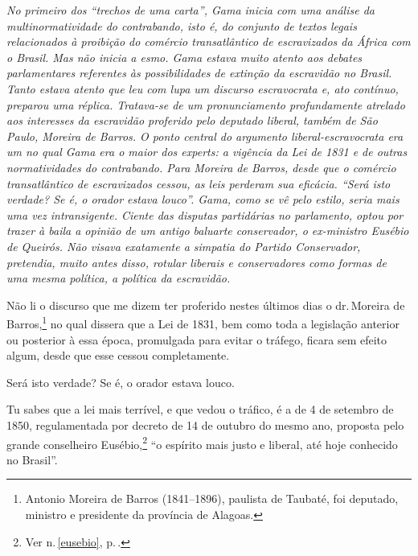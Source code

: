 {

\begin{resumo}
\emph{No primeiro dos ``trechos de uma carta'', Gama inicia com uma
análise da multinormatividade do contrabando, isto é, do conjunto de
textos legais relacionados à proibição do comércio transatlântico de
escravizados da África com o Brasil. Mas não inicia a esmo. Gama estava
muito atento aos debates parlamentares referentes às possibilidades de
extinção da escravidão no Brasil. Tanto estava atento que leu com lupa
um discurso escravocrata e, ato contínuo, preparou uma réplica.
Tratava-se de um pronunciamento profundamente atrelado aos interesses da
escravidão proferido pelo deputado liberal, também de São Paulo, Moreira
de Barros. O ponto central do argumento liberal-escravocrata era um no
qual Gama era o maior dos experts: a vigência da Lei de 1831 e de outras
normatividades do contrabando. Para Moreira de Barros, desde que o
comércio transatlântico de escravizados cessou, as leis perderam sua
eficácia. ``Será isto verdade? Se é, o orador estava louco''. Gama, como
se vê pelo estilo, seria mais uma vez intransigente. Ciente das disputas
partidárias no parlamento, optou por trazer à baila a opinião de um
antigo baluarte conservador, o ex-ministro Eusébio de Queirós. Não
visava exatamente a simpatia do Partido Conservador, pretendia, muito
antes disso, rotular liberais e conservadores como formas de uma mesma
política, a política da escravidão. }
\end{resumo}

Não li o discurso que me dizem ter proferido nestes últimos dias o dr.\,Moreira de Barros,\footnote{Antonio Moreira de Barros (1841--1896),
  paulista de Taubaté, foi deputado, ministro e presidente da província
  de Alagoas.} no qual dissera que a Lei de 1831, bem como toda a
legislação anterior ou posterior à essa época, promulgada para evitar o
tráfego, ficara sem efeito algum, desde que esse cessou completamente.

Será isto verdade? Se é, o orador estava louco.

Tu sabes que a lei mais terrível, e que vedou o tráfico, é a de 4 de
setembro de 1850, regulamentada por decreto de 14 de outubro do mesmo
ano, proposta pelo grande conselheiro Eusébio,\footnote{Ver n.\,\ref{eusebio}, p.\,\pageref{eusebio}.} ``o espírito
mais justo e liberal, até hoje conhecido no Brasil''.

}
